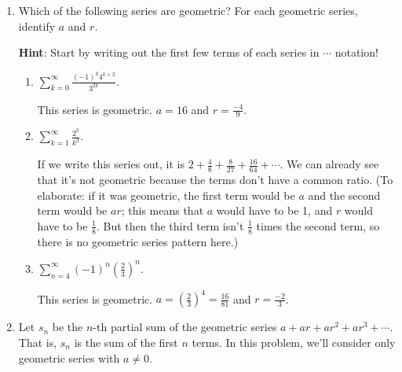 \documentclass[main]{subfiles}
\begin{document}
  \begin{enumerate}[resume]

    \item  Which of the
  following series are geometric?  For each geometric series, identify $a$
  and $r$. 
  
  \textbf{Hint}: Start by writing out the first few terms of each series in $\cdots$ notation!
  \begin{enumerate}
    \item
    \begin{problem}[\vfill]
    $\displaystyle \sum_{k=0}^\infty \frac{(-1)^k 4^{k+2}}{3^{2k}}$.
    \end{problem}

    \begin{solution}
This series is geometric. $a=16$ and $r=\frac{-4}{9}$.
    \end{solution}

    \item
    \begin{problem}[\vfill]
    $\displaystyle \sum_{k=1}^{\infty} \frac{2^k}{k^3}$.
    \end{problem}

    \begin{solution}
    If we write this series out, it is $2 + \frac{4}{8} + \frac{8}{27} +
    \frac{16}{64} + \cdots$.  We can already see that it's not geometric
    because the terms don't have a common ratio.  (To elaborate: if it
    was geometric, the first term would be $a$ and the second term would
    be $ar$; this means that $a$ would have to be 1, and $r$ would have
    to be $\frac{1}{8}$.  But then the third term isn't $\frac{1}{8}$ times the second term,
    so there is no geometric series pattern here.)
    \end{solution}

    \item
    \begin{problem}[\vfill]
    $\displaystyle \sum_{n=4}^{\infty} (-1)^n\left(\frac{2}{3}\right)^n$.
    \end{problem}

    \begin{solution}
   This series is geometric. $a=\left(\frac{2}{3}\right)^4=\frac{16}{81}$ and $r=\frac{-2}{3}$.
    \end{solution}
\end{enumerate}
  \pspace{\newpage}
  \item 
  Let $s_n$ be the $n$-th partial sum
  of the geometric series $a + ar + ar^2 + ar^3 + \cdots$.  That is, $s_n$
  is the sum of the first $n$ terms.  In this problem, we'll consider only
  geometric series with $a \neq 0$.
  \begin{enumerate}


\end{enumerate}
\end{enumerate}
\end{document}
